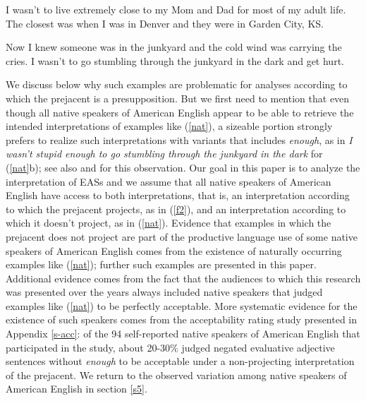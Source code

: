 \documentclass[11pt,fleqn]{article}
\newcommand{\6}{\mbox{$[\hspace*{-.6mm}[$}}
\newcommand{\9}{\mbox{$]\hspace*{-.6mm}]$}}
\begin{document}
\begin{exe}
\ex\label{nat} \citealt[235]{karttunen-etal2014}
\begin{xlist}
\ex I wasn't  to live extremely close to my Mom and Dad for most of my adult life. The closest was when I was in Denver and they were in Garden City, KS.


\ex  Now I knew someone was in the junkyard and the cold wind was
carrying the cries. I wasn't  to go stumbling through the
junkyard in the dark and get hurt.

\end{xlist} \end{exe} 

We discuss below why such examples are problematic for analyses according to which the prejacent is a presupposition. But we first need to mention that even though all native speakers of American English appear to be able to retrieve the intended interpretations of examples like (\ref{nat}), a sizeable portion strongly prefers to realize such interpretations with variants that includes {\em enough}, as in {\em I wasn't stupid enough to go stumbling through the junkyard in the dark} for (\ref{nat}b); see also \citealt{karttunen2013} and \citealt{karttunen-etal2014} for this observation. Our goal in this paper is to analyze the interpretation of EASs and we assume that all native speakers of American English have access to both interpretations, that is, an interpretation according to which the prejacent projects, as in (\ref{f2}), and an interpretation according to which it doesn't project, as in (\ref{nat}). Evidence that examples in which the prejacent does not project are part of the productive language use of some native speakers of American English comes from the existence of naturally occurring examples like (\ref{nat}); further  such examples are presented in this paper. Additional evidence comes from the fact that the audiences to which this research was presented over the years always included native speakers that judged examples like (\ref{nat}) to be perfectly acceptable. More systematic evidence for the existence of such speakers comes from the acceptability rating study presented in Appendix \ref{s-acc}: of the 94 self-reported native speakers of American English that participated in the study, about 20-30\% judged negated evaluative adjective sentences without {\em enough} to be acceptable under a non-projecting interpretation of the prejacent. We return to the observed variation among native speakers of American English in section \ref{s5}.
\end{document}
